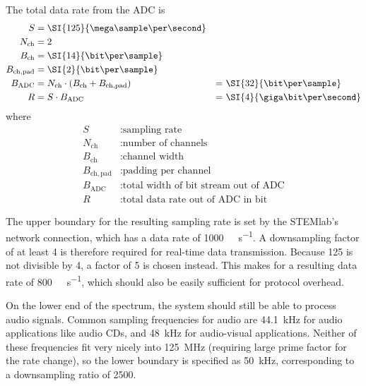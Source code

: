 The total data rate from the ADC is
\begin{alignat}{4}
    S                  &= \SI{125}{\mega\sample\per\second}                                  & & \nonumber  \\
    N_\mathrm{ch}      &= 2                                                                  & & \nonumber  \\
    B_\mathrm{ch}      &= \SI{14}{\bit\per\sample}                                           & & \nonumber  \\
    B_\mathrm{ch,pad}  &= \SI{2}{\bit\per\sample}                                            & & \nonumber  \\
    B_\mathrm{ADC}     &= N_\mathrm{ch} \cdot \left(B_\mathrm{ch} + B_\mathrm{ch,pad}\right) \,\,&=&\,\, \SI{32}{\bit\per\sample} \nonumber \\
    R                  &= S \cdot B_\mathrm{ADC}                                             \,\,&=&\,\, \SI{4}{\giga\bit\per\second} \label{eq:adc_data_rate}
\end{alignat}
where
\begin{align*}
    S                  &: \text{sampling rate}                        \\
    N_\mathrm{ch}      &: \text{number of channels}                   \\
    B_\mathrm{ch}      &: \text{channel width}                        \\
    B_\mathrm{ch,pad}  &: \text{padding per channel}                  \\
    B_\mathrm{ADC}     &: \text{total width of bit stream out of ADC} \\
    R                  &: \text{total data rate out of ADC in bit}
\end{align*}

The   upper   boundary  for   the   resulting   sampling   rate  is   set   by
the   STEMlab's   network    connection,   which   has   a    data   rate   of
\SI{1000}{\mega\bit\per\second}. A downsampling factor of  at least \num{4} is
therefore required  for real-time data transmission. Because  \num{125} is not
divisible by \num{4}, a factor of  \num{5} is chosen instead. This makes for a
resulting data  rate of  \SI{800}{\mega\bit\per\second}, which should  also be
easily sufficient for protocol overhead.

On the lower end  of the spectrum, the system should still  be able to process
audio  signals. Common  sampling  frequencies for  audio  are  \SI{44.1}{\kHz}
for  audio applications  like audio  CDs, and  \SI{48}{\kHz} for  audio-visual
applications. Neither of these frequencies fit very nicely into \SI{125}{\MHz}
(requiring large  prime factor  for the  rate change),  so the  lower boundary
is  specified  as \SI{50}{\kHz},  corresponding  to  a downsampling  ratio  of
\num{2500}.

